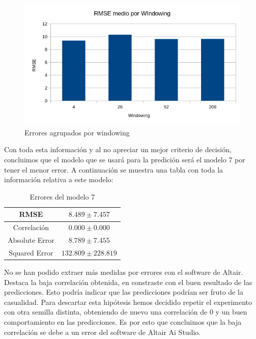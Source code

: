 \documentclass[12pt]{report} %
\begin{document}
\begin{figure}[H]
    \includegraphics[width=\linewidth]{RMSE-windowing.png}
    \caption {\small Errores agrupados por windowing}
\end{figure}

Con toda esta información y al no apreciar un mejor criterio de decisión, concluimos que el modelo que se usará para la predición será el modelo 7 por tener el menor error. A continuación se muestra una tabla con toda la información relativa a este modelo:

\begin{table}[H]
\begin{center}
\begin{tabular}{|c|c|}
    \hline
    RMSE                        & $8.489\pm 7.457$\\ 
    \hline
    Correlación                 & $0.000\pm 0.000$\\
    \hline
    Absolute Error              & $8.789\pm7.455$\\
    \hline
    Squared Error               & $132.809\pm 228.819$\\ 
    \hline
\end{tabular}
\caption{Errores del modelo 7}
\end{center}
\end{table}

No se han podido extraer más medidas por errores con el software de Altair. Destaca la baja correlación obtenida, en constraste con el buen resultado de las predicciones. Esto podría indicar que las predicciones podrían ser fruto de la casualidad. Para descartar esta hipótesis hemos decidido repetir el experimento con otra semilla distinta, obteniendo de nuevo una correlación de 0 y un buen comportamiento en las predicciones. Es por esto que concluimos que la baja correlación se debe a un error del software de Altair Ai Studio.
\end{document}
